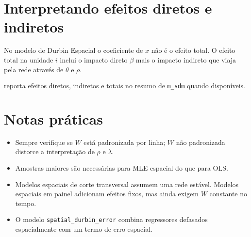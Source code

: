 \section{Interpretando efeitos diretos e indiretos}

No modelo de Durbin Espacial o coeficiente de $x$ não é o efeito total.
O efeito total na unidade $i$ inclui o impacto direto $\beta$ mais o
impacto indireto que viaja pela rede através de $\theta$ e $\rho$.

\hayashi{} reporta efeitos diretos, indiretos e totais no resumo de
\texttt{m\_sdm} quando disponíveis.

\section{Notas práticas}

\begin{itemize}
\item Sempre verifique se $W$ está padronizada por linha; $W$ não
      padronizada distorce a interpretação de $\rho$ e $\lambda$.
\item Amostras maiores são necessárias para MLE espacial do que para OLS.
\item Modelos espaciais de corte transversal assumem uma rede estável.
      Modelos espaciais em painel adicionam efeitos fixos, mas ainda
      exigem $W$ constante no tempo.
\item O modelo \texttt{spatial\_durbin\_error} combina regressores defasados
      espacialmente com um termo de erro espacial.
\end{itemize}
